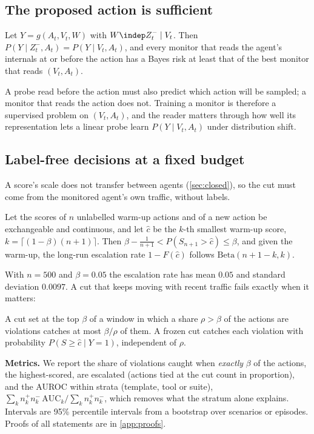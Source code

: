 \subsection{The proposed action is sufficient}
\begin{corollary}\label{cor:action}
Let $Y=g(A_t,V_t,W)$ with $W\indep Z^-_t\mid V_t$. Then $P(Y\mid Z^-_t,A_t)=P(Y\mid V_t,A_t)$, and every monitor that reads the agent's internals at or before the action has a Bayes risk at least that of the best monitor that reads $(V_t,A_t)$.
\end{corollary}
A probe read before the action must also predict which action will be sampled; a monitor that reads the action does not. Training a monitor is therefore a supervised problem on $(V_t,A_t)$, and the reader matters through how well its representation lets a linear probe learn $P(Y\mid V_t,A_t)$ under distribution shift.

\subsection{Label-free decisions at a fixed budget}
A score's scale does not transfer between agents (\cref{sec:closed}), so the cut must come from the monitored agent's own traffic, without labels.
\begin{proposition}\label{prop:frozen}
Let the scores of $n$ unlabelled warm-up actions and of a new action be exchangeable and continuous, and let $\hat c$ be the $k$-th smallest warm-up score, $k=\lceil(1-\beta)(n+1)\rceil$. Then $\beta-\tfrac{1}{n+1}<P(S_{n+1}>\hat c)\le\beta$, and given the warm-up, the long-run escalation rate $1-F(\hat c)$ follows $\mathrm{Beta}(n+1-k,k)$.
\end{proposition}
With $n=500$ and $\beta=0.05$ the escalation rate has mean $0.05$ and standard deviation $0.0097$. A cut that keeps moving with recent traffic fails exactly when it matters:
\begin{proposition}[bursts]\label{prop:burst}
A cut set at the top $\beta$ of a window in which a share $\rho>\beta$ of the actions are violations catches at most $\beta/\rho$ of them. A frozen cut catches each violation with probability $P(S\ge\hat c\mid Y=1)$, independent of $\rho$.
\end{proposition}
\textbf{Metrics.} We report the share of violations caught when \emph{exactly} $\beta$ of the actions, the highest-scored, are escalated (actions tied at the cut count in proportion), and the AUROC within strata (template, tool or suite), $\sum_k n^+_kn^-_k\,\mathrm{AUC}_k/\sum_k n^+_kn^-_k$, which removes what the stratum alone explains. Intervals are 95\% percentile intervals from a bootstrap over scenarios or episodes. Proofs of all statements are in \cref{app:proofs}.

